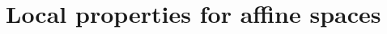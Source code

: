 \documentclass[12pt]{amsart}
\newtheorem{theorem}{Theorem}[section]
\theoremstyle{definition}
\newtheorem*{axiom}{Axiom}
\newcommand{\mbb}[1]{\mathbb{#1}}
\newcommand{\I}{\mbb I}
\newcommand{\ms}[1]{\mathsf{#1}}
\newcommand{\eq}{\leftrightarrow}
\begin{document}






\section{Local properties for affine spaces}\label{sec:local}
\end{document}
